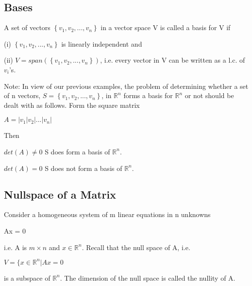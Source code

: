 \documentclass{extarticle}
\begin{document}
\begin{tcolorbox}[enhanced jigsaw,sharp corners,coltext=black,colback=BurntOrange!25!white,boxrule=0pt,breakable,size=minimal]

\subsection{Bases}
A set of vectors $\left\{v_1,v_2,...,v_n\right\}$ in a vector space V is called a basis for V if

(i) $\left\{v_1,v_2,...,v_n\right\}$ is linearly independent and 

(ii) $V=span(\left\{v_1,v_2,...,v_n\right\})$, i.e. every vector in V can be written as a l.c. of $v_i$'s.

Note: In view of our previous examples, the problem of determining whether a set of n vectors, $S = \left\{v_1,v_2,...,v_n\right\}$, in ${\mathbb{R}}^n$ forms a basis for ${\mathbb{R}}^n$ or not should be dealt with as follows. Form the square matrix

$A = \left|v_1|v_2|...|v_n\right|$

Then

$det(A) \neq 0$ S does form a basis of ${\mathbb{R}}^n$.

$det(A) = 0$ S does not form a basis of ${\mathbb{R}}^n$.

\end{tcolorbox}



\subsection{Nullspace of a Matrix}
Consider a homogeneous system of m linear equations in n unknowns

Ax = 0

i.e. A is $m \times n$ and $x \in {\mathbb{R}}^n$. Recall that the null space of A, i.e.

$V = \{ x \in {\mathbb{R}}^n | Ax = 0$

is a subspace of ${\mathbb{R}}^n$. The dimension of the null space is called the nullity of A.
\end{document}
